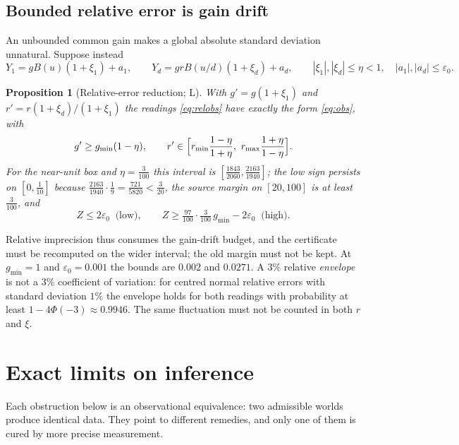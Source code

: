 \documentclass[11pt]{article}
\theoremstyle{plain}
\newtheorem{proposition}[theorem]{Proposition}
\theoremstyle{definition}
\numberwithin{equation}{section}
\newcommand{\eps}{\varepsilon}
\newcommand{\gmin}{g_{\min}}
\newcommand{\Lean}{\textsf{L}}   %
\begin{document}
\subsection{Bounded relative error is gain drift}
An unbounded common gain makes a global absolute standard deviation unnatural.
Suppose instead
\begin{equation}\label{eq:relobs}
 Y_1=gB(u)(1+\xi_1)+a_1,\qquad Y_d=grB(u/d)(1+\xi_d)+a_d,
 \qquad|\xi_1|,|\xi_d|\le\eta<1,\quad|a_1|,|a_d|\le\eps_0 .
\end{equation}
\begin{proposition}[Relative-error reduction; \Lean]\label{prop:relative}
With $g'=g(1+\xi_1)$ and $r'=r(1+\xi_d)/(1+\xi_1)$ the readings \eqref{eq:relobs}
have exactly the form \eqref{eq:obs}, with
\begin{equation}\label{eq:relbounds}
 g'\ge\gmin(1-\eta),\qquad
 r'\in\Bigl[r_{\min}\frac{1-\eta}{1+\eta},\ r_{\max}\frac{1+\eta}{1-\eta}\Bigr].
\end{equation}
For the near-unit box and $\eta=\frac3{100}$ this interval is
$[\frac{1843}{2060},\frac{2163}{1940}]$; the low sign persists on $[0,\frac1{10}]$
because $\frac{2163}{1940}\cdot\frac19=\frac{721}{5820}<\frac3{20}$, the source margin
on $[20,100]$ is at least $\frac3{100}$, and
\[
 Z\le2\eps_0\ \text{ (low)},\qquad
 Z\ge\tfrac{97}{100}\cdot\tfrac3{100}\,\gmin-2\eps_0\ \text{ (high)}.
\]
\end{proposition}
Relative imprecision thus consumes the gain-drift budget, and the certificate must
be recomputed on the wider interval; the old margin must not be kept. At $\gmin=1$
and $\eps_0=0.001$ the bounds are $0.002$ and $0.0271$. A $3\%$ relative
\emph{envelope} is not a $3\%$ coefficient of variation: for centred normal
relative errors with standard deviation $1\%$ the envelope holds for both readings
with probability at least $1-4\Phi(-3)\approx0.9946$. The same fluctuation must not
be counted in both $r$ and $\xi$.

\section{Exact limits on inference}\label{sec:limits}
Each obstruction below is an observational equivalence: two admissible worlds
produce identical data. They point to different remedies, and only one of them is
cured by more precise measurement.
\end{document}
